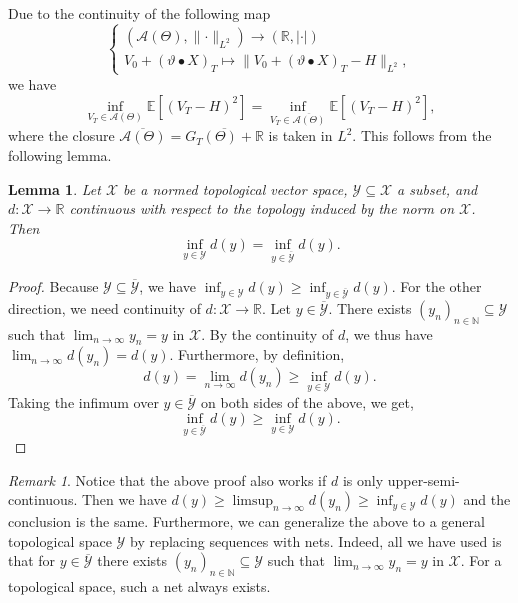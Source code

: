\documentclass[11pt,a4paper,twoside,openany]{report}
\numberwithin{equation}{section}
\theoremstyle{plain} %
\newtheorem{lemma}[theorem]{Lemma}
\theoremstyle{definition} %
\theoremstyle{remark} %
\newtheorem{remark}[theorem]{Remark}
\begin{document}
Due to the continuity of the following map
\begin{equation*}
\begin{cases}
    (\mathcal{A}(\Theta),\lVert\cdot\rVert_{L^2})\to(\mathbb{R},|\cdot|)\\
    V_0+(\vartheta\bullet X)_T\mapsto\lVert V_0+(\vartheta\bullet X)_T-H\rVert_{L^2},
\end{cases}
\end{equation*}
we have 
\begin{equation}\label{eq:mean squared hedging over closure}
\inf_{V_T\in\mathcal{A}(\Theta)}\mathbb{E}[\left(V_T-H\right)^2]=\inf_{V_T\in \overline{\mathcal{A}(\Theta)}}\mathbb{E}[\left(V_T-H\right)^2],
\end{equation}
where the closure \(\overline{\mathcal{A}(\Theta)}=\overline{G_T(\Theta)+\mathbb{R}}\) is taken in \(L^2\). 
This follows from the following lemma.
\begin{lemma}\label{lemma:minimization of closure}
     Let \(\mathcal{X}\) be a normed topological vector space, \(\mathcal{Y}\subseteq \mathcal{X}\) a subset, and \(d:\mathcal{X}\to\mathbb{R}\) continuous with respect to the topology induced by the norm on \(\mathcal{X}\). Then 
     \begin{equation*}
         \inf_{y\in \mathcal{Y}} d(y)=\inf_{y\in\overline{\mathcal{Y}}} d(y).
     \end{equation*}
\end{lemma}
\begin{proof}
 Because \(\mathcal{Y}\subseteq\overline{\mathcal{Y}}\), we have \(\inf_{y\in \mathcal{Y}} d(y)\geq\inf_{y\in\overline{\mathcal{Y}}} d(y)\). For the other direction, we need continuity of \(d:\mathcal{X}\to\mathbb{R}\). Let \(y\in\overline{\mathcal{Y}}\). There exists \((y_n)_{n\in\mathbb{N}}\subseteq \mathcal{Y}\) such that \(\lim_{n\to\infty}y_n = y\) in \(\mathcal{X}\). By the continuity of \(d\), we thus have \(\lim_{n\to\infty}d(y_n) = d(y)\). Furthermore, by definition,
    \begin{equation*}
        d(y)=\lim_{n\to\infty}d(y_n)\geq\inf_{y\in \mathcal{Y}} d(y).
    \end{equation*}
    Taking the infimum over \(y\in\overline{\mathcal{Y}}\) on both sides of the above, we get,
    \begin{equation*}
        \inf_{y\in\overline{\mathcal{Y}}} d(y) \geq \inf_{y\in \mathcal{Y}} d(y).
    \end{equation*}
\end{proof}
\begin{remark}
   Notice that the above proof also works if \(d\) is only upper-semi-continuous. Then we have \(d(y)\geq\limsup_{n\to\infty}{d(y_n)}\geq\inf_{y\in \mathcal{Y}}d(y)\) and the conclusion is the same. Furthermore, we can generalize the above to a general topological space \(\mathcal{Y}\) by replacing sequences with nets. Indeed, all we have used is that for \(y\in\overline{\mathcal{Y}}\) there exists \((y_n)_{n\in\mathbb{N}}\subseteq \mathcal{Y}\) such that \(\lim_{n\to\infty}y_n = y\) in \(\mathcal{X}\). For a topological space, such a net always exists.
\end{remark}
\end{document}
